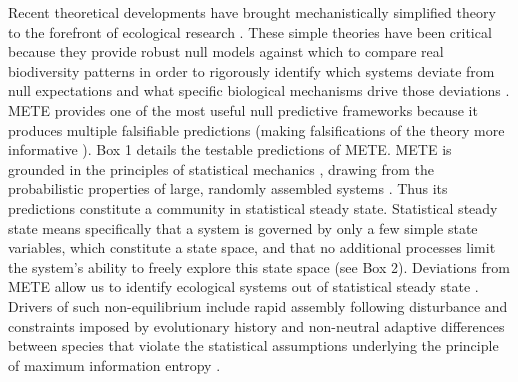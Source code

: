 \documentclass[11pt]{article}
\begin{document}
Recent theoretical developments have brought mechanistically
simplified theory to the forefront of ecological research
\citep{hubbell2001, rosindell2011TREE, harte2011}.  These simple
theories have been critical because they provide robust null models
against which to compare real biodiversity patterns in order to
rigorously identify which systems deviate from null expectations and
what specific biological mechanisms drive those deviations
\citep{rosindell2011TREE, harte2011, rominger2016}.  METE
\citep{harte2011} provides one of the most useful null predictive
frameworks because it produces multiple falsifiable predictions
(making falsifications of the theory more informative
\citep{mcgill2003}). Box 1 details the testable predictions of METE.
METE is grounded in the principles of statistical mechanics
\citep{harte2011, Jaynes1957}, drawing from the probabilistic
properties of large, randomly assembled systems
\citep{harte2011}. Thus its predictions constitute a community in
statistical steady state.  Statistical steady state means specifically
that a system is governed by only a few simple state variables, which
constitute a state space, and that no additional processes limit the
system's ability to freely explore this state space (see Box 2).
Deviations from METE allow us to identify ecological systems out of
statistical steady state \citep{harte2011, rominger2015}.  Drivers of
such non-equilibrium include rapid assembly following disturbance
\citep{harte2011} and constraints imposed by evolutionary history and
non-neutral adaptive differences between species that violate the
statistical assumptions underlying the principle of maximum
information entropy \citep{rominger2015}.
\end{document}
